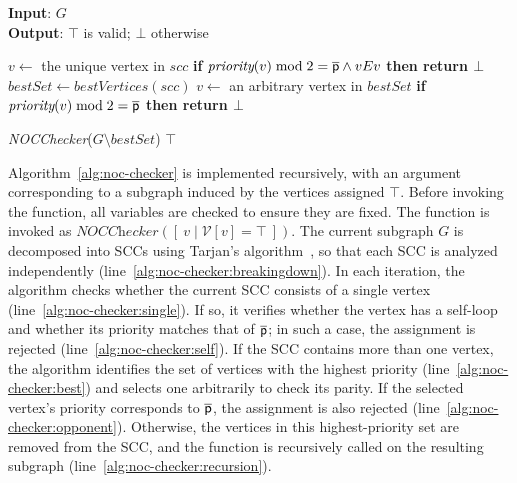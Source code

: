 \documentclass{article}
\begin{document}
\begin{algorithm}
\small
\caption{\textbf{\textit{NOCChecker}}}
\textbf{Input}: $G$ \\
\textbf{Output}: $\top$ is valid; $\bot$ otherwise
\begin{algorithmic}[1]
     \label{alg:noc-checker:breakingdown}
         \label{alg:noc-checker:single}
            \STATE $v \gets$ the unique vertex in $scc$
            \STATE \textbf{if }$\textit{priority}(v) \bmod 2 = \opponent \land vEv$ \textbf{then return $\bot$} \label{alg:noc-checker:self}  
        \ELSE
            \STATE $bestSet \gets \textit{bestVertices}(scc)$ \label{alg:noc-checker:best}
            \STATE $v \gets$ an arbitrary vertex in $bestSet$
            \STATE \textbf{if }$\textit{priority}(v) \bmod 2 = \opponent$ \textbf{then return $\bot$} \label{alg:noc-checker:opponent}  

            \STATE \textit{NOCChecker}($G \setminus bestSet$) \label{alg:noc-checker:recursion}
        \ENDIF
    \ENDFOR
    \RETURN $\top$
\end{algorithmic}
\label{alg:noc-checker}
\end{algorithm}

Algorithm~\ref{alg:noc-checker} is implemented recursively, with an argument corresponding to a subgraph induced by the vertices assigned $\top$. Before invoking the function, all variables are checked to ensure they are fixed. The function is invoked as $\textit{NOCChecker}([\ { v \mid \mathcal{V}[v] = \top }\ ])$. The current subgraph $G$ is decomposed into SCCs using Tarjan’s algorithm~\cite{Tarjan:1972}, so that each SCC is analyzed independently (line~\ref{alg:noc-checker:breakingdown}).
%
In each iteration, the algorithm checks whether the current SCC consists of a single vertex (line~\ref{alg:noc-checker:single}). If so, it verifies whether the vertex has a self-loop and whether its priority matches that of $\opponent$; in such a case, the assignment is rejected (line~\ref{alg:noc-checker:self}).
%
If the SCC contains more than one vertex, the algorithm identifies the set of vertices with the highest priority (line~\ref{alg:noc-checker:best}) and selects one arbitrarily to check its parity. If the selected vertex’s priority corresponds to $\opponent$, the assignment is also rejected (line~\ref{alg:noc-checker:opponent}). Otherwise, the vertices in this highest-priority set are removed from the SCC, and the function is recursively called on the resulting subgraph (line~\ref{alg:noc-checker:recursion}).
\end{document}
